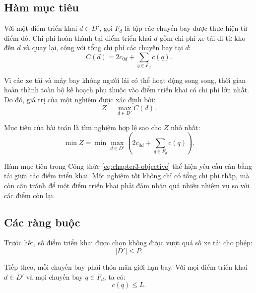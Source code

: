 \subsection{Hàm mục tiêu}

Với một điểm triển khai $d \in D'$, gọi $F_d$ là tập các chuyến bay được thực hiện từ điểm đó. Chi phí hoàn thành tại điểm triển khai $d$ gồm chi phí xe tải đi từ kho đến $d$ và quay lại, cộng với tổng chi phí các chuyến bay tại $d$:
\begin{equation}
    C(d) = 2c_{0d} + \sum_{q \in F_d} c(q).
    \label{eq:chapter3-route-cost}
\end{equation}

Vì các xe tải và máy bay không người lái có thể hoạt động song song, thời gian hoàn thành toàn bộ kế hoạch phụ thuộc vào điểm triển khai có chi phí lớn nhất. Do đó, giá trị của một nghiệm được xác định bởi:
\begin{equation}
    Z = \max_{d \in D'} C(d).
    \label{eq:chapter3-solution-cost}
\end{equation}

Mục tiêu của bài toán là tìm nghiệm hợp lệ sao cho $Z$ nhỏ nhất:
\begin{equation}
    \min Z = \min \max_{d \in D'} \left(2c_{0d} + \sum_{q \in F_d} c(q)\right).
    \label{eq:chapter3-objective}
\end{equation}

Hàm mục tiêu trong Công thức \eqref{eq:chapter3-objective} thể hiện yêu cầu cân bằng tải giữa các điểm triển khai. Một nghiệm tốt không chỉ có tổng chi phí thấp, mà còn cần tránh để một điểm triển khai phải đảm nhận quá nhiều nhiệm vụ so với các điểm còn lại.

\subsection{Các ràng buộc}

Trước hết, số điểm triển khai được chọn không được vượt quá số xe tải cho phép:
\begin{equation}
    |D'| \leq P.
    \label{eq:chapter3-truck-limit}
\end{equation}

Tiếp theo, mỗi chuyến bay phải thỏa mãn giới hạn bay. Với mọi điểm triển khai $d \in D'$ và mọi chuyến bay $q \in F_d$, ta có:
\begin{equation}
    c(q) \leq L.
    \label{eq:chapter3-flight-limit}
\end{equation}

